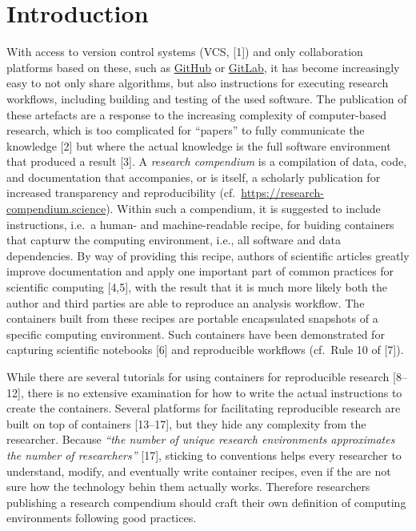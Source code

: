 \documentclass[10pt,letterpaper]{article}
\begin{document}
\linenumbers

\hypertarget{introduction}{%
\section*{Introduction}\label{introduction}}

With access to version control systems (VCS, {[}1{]}) and only
collaboration platforms based on these, such as
\href{https://github.com}{GitHub} or \href{https://gitlab.com}{GitLab},
it has become increasingly easy to not only share algorithms, but also
instructions for executing research workflows, including building and
testing of the used software. The publication of these artefacts are a
response to the increasing complexity of computer-based research, which
is too complicated for ``papers'' to fully communicate the knowledge
{[}2{]} but where the actual knowledge is the full software environment
that produced a result {[}3{]}. A \emph{research compendium} is a
compilation of data, code, and documentation that accompanies, or is
itself, a scholarly publication for increased transparency and
reproducibility (cf.~\url{https://research-compendium.science}). Within
such a compendium, it is suggested to include instructions, i.e.~a
human- and machine-readable recipe, for buiding containers that capturw
the computing environment, i.e., all software and data dependencies. By
way of providing this recipe, authors of scientific articles greatly
improve documentation and apply one important part of common practices
for scientific computing {[}4,5{]}, with the result that it is much more
likely both the author and third parties are able to reproduce an
analysis workflow. The containers built from these recipes are portable
encapsulated snapshots of a specific computing environment. Such
containers have been demonstrated for capturing scientific notebooks
{[}6{]} and reproducible workflows (cf.~Rule 10 of {[}7{]}).

While there are several tutorials for using containers for reproducible
research {[}8--12{]}, there is no extensive examination for how to write
the actual instructions to create the containers. Several platforms for
facilitating reproducible research are built on top of containers
{[}13--17{]}, but they hide any complexity from the researcher. Because
\emph{``the number of unique research environments approximates the
number of researchers''} {[}17{]}, sticking to conventions helps every
researcher to understand, modify, and eventually write container
recipes, even if the are not sure how the technology behin them actually
works. Therefore researchers publishing a research compendium should
craft their own definition of computing environments following good
practices.
\end{document}
